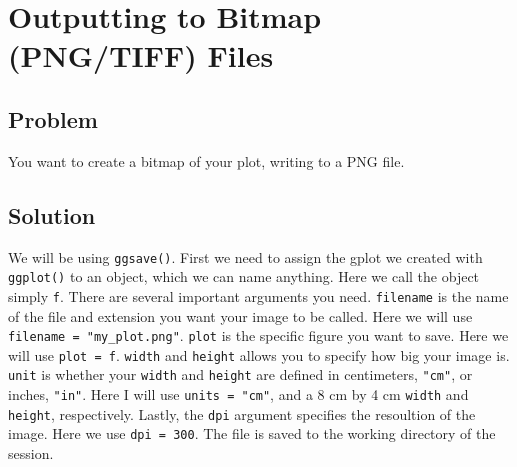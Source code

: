 \documentclass[
]{book}
\begin{document}
\hypertarget{BAR-OUTPUT-BITMAP}{%
\section{Outputting to Bitmap (PNG/TIFF) Files}\label{BAR-OUTPUT-BITMAP}}

\hypertarget{problem-21}{%
\subsection{Problem}\label{problem-21}}

You want to create a bitmap of your plot, writing to a PNG file.

\hypertarget{solution-21}{%
\subsection{Solution}\label{solution-21}}

We will be using \texttt{ggsave()}. First we need to assign the gplot we created with \texttt{ggplot()} to an object, which we can name anything. Here we call the object simply \texttt{f}. There are several important arguments you need. \texttt{filename} is the name of the file and extension you want your image to be called. Here we will use \texttt{filename\ =\ "my\_plot.png"}. \texttt{plot} is the specific figure you want to save. Here we will use \texttt{plot\ =\ f}. \texttt{width} and \texttt{height} allows you to specify how big your image is. \texttt{unit} is whether your \texttt{width} and \texttt{height} are defined in centimeters, \texttt{"cm"}, or inches, \texttt{"in"}. Here I will use \texttt{units\ =\ "cm"}, and a 8 cm by 4 cm \texttt{width} and \texttt{height}, respectively. Lastly, the \texttt{dpi} argument specifies the resoultion of the image. Here we use \texttt{dpi\ =\ 300}. The file is saved to the working directory of the session.
\end{document}
